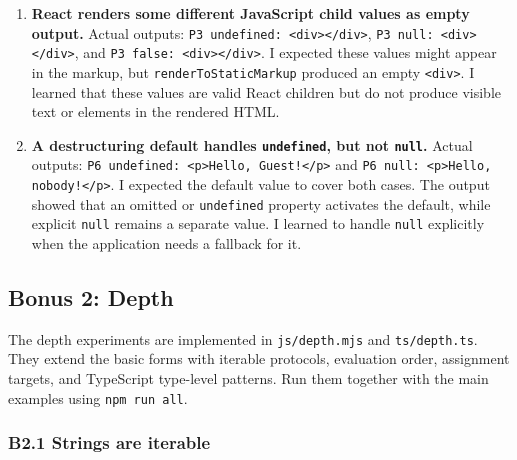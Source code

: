 \documentclass[
]{article}
\newcommand{\passthrough}[1]{#1}
\begin{document}
\begin{enumerate}
  scripts not yet covered by \passthrough{\lstinline!allowScripts!}; npm
  still reported that packages were added and
  \passthrough{\lstinline!found 0 vulnerabilities!}. I initially was
  unsure whether this meant installation had failed. I continued by
  running the project and confirmed that
  \passthrough{\lstinline!npm run all!} worked. I learned to distinguish
  a warning from a failed command and to verify by running the required
  scripts.
\item
  \textbf{React renders some different JavaScript child values as empty
  output.} Actual outputs:
  \passthrough{\lstinline!P3 undefined: <div></div>!},
  \passthrough{\lstinline!P3 null: <div></div>!}, and
  \passthrough{\lstinline!P3 false: <div></div>!}. I expected these
  values might appear in the markup, but
  \passthrough{\lstinline!renderToStaticMarkup!} produced an empty
  \passthrough{\lstinline!<div>!}. I learned that these values are valid
  React children but do not produce visible text or elements in the
  rendered HTML.
\item
  \textbf{A destructuring default handles
  \passthrough{\lstinline!undefined!}, but not
  \passthrough{\lstinline!null!}.} Actual outputs:
  \passthrough{\lstinline"P6 undefined: <p>Hello, Guest!</p>"} and
  \passthrough{\lstinline"P6 null: <p>Hello, nobody!</p>"}. I expected
  the default value to cover both cases. The output showed that an
  omitted or \passthrough{\lstinline!undefined!} property activates the
  default, while explicit \passthrough{\lstinline!null!} remains a
  separate value. I learned to handle \passthrough{\lstinline!null!}
  explicitly when the application needs a fallback for it.
\end{enumerate}

\subsection{Bonus 2: Depth}\label{bonus-2-depth}

The depth experiments are implemented in
\passthrough{\lstinline!js/depth.mjs!} and
\passthrough{\lstinline!ts/depth.ts!}. They extend the basic forms with
iterable protocols, evaluation order, assignment targets, and TypeScript
type-level patterns. Run them together with the main examples using
\passthrough{\lstinline!npm run all!}.

\subsubsection{B2.1 Strings are
iterable}\label{b21-strings-are-iterable}
\end{document}
